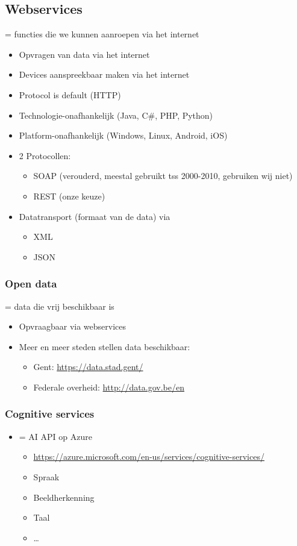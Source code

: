 \documentclass{article}
\begin{document}
\subsection{Webservices}
= functies die we kunnen aanroepen via het internet

\begin{itemize}
    \item Opvragen van data via het internet
    \item Devices aanspreekbaar maken via het internet
    \item Protocol is default (HTTP)
    \item Technologie-onafhankelijk (Java, C\#, PHP, Python)
    \item Platform-onafhankelijk (Windows, Linux, Android, iOS)
    \item 2 Protocollen:
    \begin{itemize}
        \item SOAP (verouderd, meestal gebruikt tss 2000-2010, gebruiken wij niet)
        \item REST (onze keuze)
    \end{itemize}
    \item Datatransport (formaat van de data) via
    \begin{itemize}
        \item XML
        \item JSON
    \end{itemize}
\end{itemize}

\subsubsection{Open data}
= data die vrij beschikbaar is

\begin{itemize}
    \item Opvraagbaar via webservices
    \item Meer en meer steden stellen data beschikbaar:
    \begin{itemize}
        \item Gent: \url{https://data.stad.gent/}
        \item Federale overheid: \url{http://data.gov.be/en}
    \end{itemize}
\end{itemize}

\subsubsection{Cognitive services}
\begin{itemize}
    \item = AI API op Azure
    \begin{itemize}
        \item \url{https://azure.microsoft.com/en-us/services/cognitive-services/}
        \item Spraak
        \item Beeldherkenning
        \item Taal
        \item \dots
    \end{itemize}
\end{itemize}
\end{document}
